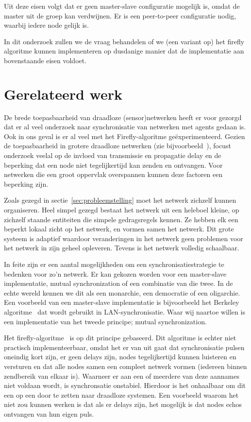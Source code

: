 \documentclass[a4paper,10pt]{article}
\begin{document}
Uit deze eisen volgt dat er geen master-slave configuratie mogelijk is, omdat de master uit de groep kan verdwijnen. Er is een peer-to-peer configuratie nodig, waarbij iedere node gelijk is.

In dit onderzoek zullen we de vraag behandelen of we (een variant op) het firefly algoritme kunnen implementeren op dusdanige manier dat de implementatie aan bovenstaande eisen voldoet.

\section{Gerelateerd werk}\label{sec:gerelateerd}
De brede toepasbaarheid van draadloze (sensor)netwerken heeft er voor gezorgd dat er al veel onderzoek naar synchronisatie van netwerken met agents gedaan is. Ook in ons geval is er al veel met het Firefly-algoritme ge\"experimenteerd. Gezien de toepasbaarheid in grotere draadloze netwerken (zie bijvoorbeeld~\cite{tyrrell2010emergent}), focust onderzoek veelal op de invloed van transmissie en propagatie delay en de beperking dat een node niet tegelijkertijd kan zenden en ontvangen. Voor netwerken die een groot oppervlak overspannen kunnen deze factoren een beperking zijn.

Zoals gezegd in sectie~\ref{sec:probleemstelling} moet het netwerk zichzelf kunnen organiseren. Heel simpel gezegd bestaat het netwerk uit een heleboel kleine, op zichzelf staande entiteiten die simpele gedragsregels kennen. Ze hebben elk een beperkt lokaal zicht op het netwerk, en vormen samen het netwerk. Dit grote systeem is adaptief waardoor veranderingen in het netwerk geen problemen voor het netwerk in zijn geheel opleveren. Tevens is het netwerk volledig schaalbaar.

In feite zijn er een aantal mogelijkheden om een synchronisatiestrategie te bedenken voor zo'n netwerk. Er kan gekozen worden voor een master-slave implementatie, mutual synchronization of een combinatie van die twee. In de echte wereld kennen we dit als een monarchie, een democratie of een oligarchie. Een voorbeeld van een master-slave implementatie is bijvoorbeeld het Berkeley algoritme~\cite{gusella1989accuracy} dat wordt gebruikt in LAN-synchronisatie. Waar wij naartoe willen is een implementatie van het tweede principe; mutual synchronization.

Het firefly-algoritme~\cite{yang2013firefly} is op dit principe gebaseerd. Dit algoritme is echter niet practisch implementeerbaar, omdat het er van uit gaat dat synchronisatie pulsen oneindig kort zijn, er geen delays zijn, nodes tegelijkertijd kunnen luisteren en versturen en dat alle nodes samen een compleet netwerk vormen (iedereen binnen zendbereik van elkaar is). Waarneer er aan een of meerdere van deze aannames niet voldaan wordt, is synchronsatie onstabiel. Hierdoor is het onhaalbaar om dit een op een door te zetten naar draadloze systemen. Een voorbeeld waarom het niet zou kunnen werken is dat als er delays zijn, het mogelijk is dat nodes echos ontvangen van hun eigen puls.
\end{document}
